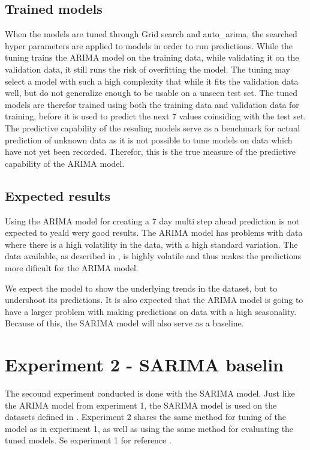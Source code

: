   \subsection{Trained models}
  When the models are tuned through Grid search and auto\_arima,
  the searched hyper parameters are applied to models in order to run predictions.
  While the tuning trains the ARIMA model on the training data, while validating it on the validation data,
  it still runs the risk of overfitting the model.
  The tuning may select a model with such a high complexity that while it fits the validation data well,
  but do not generalize enough to be usable on a unseen test set.
  The tuned models are therefor trained using both the training data and validation data for training,
  before it is used to predict the next 7 values coinsiding with the test set.
  The predictive capability of the resuling models serve as a benchmark for actual prediction
  of unknown data as it is not possible to tune models on data which have not yet been recorded.
  Therefor, this is the true measure of the predictive capability of the ARIMA model.


  \subsection{Expected results}

  Using the ARIMA model for creating a 7 day multi step ahead prediction is not expected to yeald wery good results.
  The ARIMA model has problems with data where there is a high volatility in the data, with a high standard variation.
  The data available, as described in ,
  is highly volatile and thus makes the predictions more dificult for the ARIMA model.

  We expect the model to show the underlying trends in the dataset, but to
  undershoot its predictions.
  It is also expected that the ARIMA model is going to have a larger problem with making predictions on data with a high seasonality.
  Because of this, the SARIMA model will also serve as a baseline.


  \section{Experiment 2 - SARIMA baselin}
  \label{section:Method:Experiment2}

  The secound experiment conducted is done with the SARIMA model.
  Just like the ARIMA model from experiment 1, the SARIMA model is used on the datasets defined in .
  Experiment 2 shares the same method for tuning of the model as in experiment 1,
  as well as using the same method for evaluating the tuned models.
  Se experiment 1 for reference .

